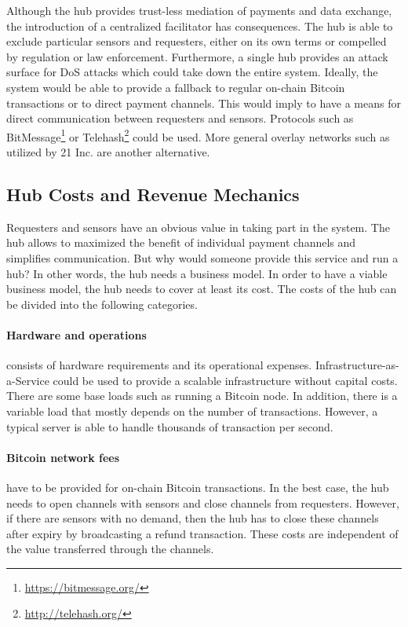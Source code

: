 Although the hub provides trust-less mediation of payments and data exchange, the introduction of a centralized facilitator has consequences. The hub is able to exclude particular sensors and requesters, either on its own terms or compelled by regulation or law enforcement. Furthermore, a single hub provides an attack surface for \ac{DoS} attacks which could take down the entire system. Ideally, the system would be able to provide a fallback to regular on-chain Bitcoin transactions or to direct payment channels. This would imply to have a means for direct communication between requesters and sensors. Protocols such as BitMessage\footnote{\url{https://bitmessage.org/}} or Telehash\footnote{\url{http://telehash.org/}} could be used. More general overlay networks such as utilized by 21 Inc. are another alternative.

\subsection{Hub Costs and Revenue Mechanics}
\label{sec:hubbiz}

Requesters and sensors have an obvious value in taking part in the system. The hub allows to maximized the benefit of individual payment channels and simplifies communication. But why would someone provide this service and run a hub? In other words, the hub needs a business model. In order to have a viable business model, the hub needs to cover at least its cost. The costs of the hub can be divided into the following categories. 

\paragraph{Hardware and operations} consists of hardware requirements and its operational expenses. Infrastructure-as-a-Service could be used to provide a scalable infrastructure without capital costs. There are some base loads such as running a Bitcoin node. In addition, there is a variable load that mostly depends on the number of transactions. However, a typical server is able to handle thousands of transaction per second.

\paragraph{Bitcoin network fees} have to be provided for on-chain Bitcoin transactions. In the best case, the hub needs to open channels with sensors and close channels from requesters. However, if there are sensors with no demand, then the hub has to close these channels after expiry by broadcasting a refund transaction. These costs are independent of the value transferred through the channels.

